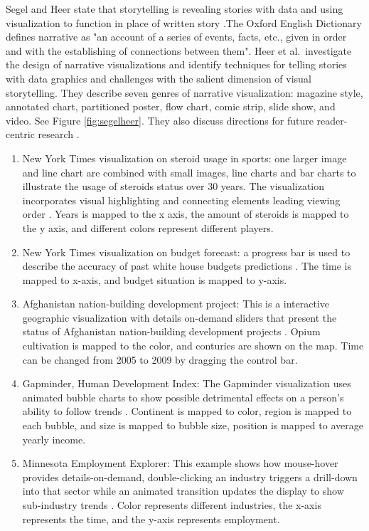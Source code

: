 \documentclass{egpubl}
\begin{document}
 Segel and Heer state that storytelling  is revealing stories with data and using visualization to function in place of written story \cite{segal}.The Oxford English Dictionary defines narrative as "an account of a series of events, facts, etc., given in order and with the establishing of connections between them". 
Heer et al.\ investigate the design of narrative visualizations and identify techniques for telling stories with data graphics and challenges with the salient dimension of visual storytelling. They describe seven genres of narrative visualization: magazine style, annotated chart, partitioned poster, flow chart, comic strip, slide show, and video. See Figure \ref{fig:segelheer}. They also discuss directions for future reader-centric research \cite{Heer1}.
\begin{enumerate}
\item New York Times visualization on steroid usage in sports: one larger image and line chart are combined with small images, line charts and bar charts to illustrate the usage of steroids status over 30 years. The visualization incorporates visual highlighting and connecting elements leading viewing order \cite{steroids}. Years is mapped to the x axis, the amount of steroids is mapped to the y axis, and different colors represent different players.
\item New York Times visualization on budget forecast: a progress bar is used to describe the accuracy of past white house budgets predictions \cite{budget}. The time is mapped to x-axis, and budget situation is mapped to y-axis.
\item Afghanistan nation-building development project: This is a interactive geographic visualization with details on-demand sliders that present the status of Afghanistan nation-building development projects \cite{afghanistan}. Opium cultivation is mapped to the color, and conturies are shown on the map. Time can be changed from 2005 to 2009 by dragging the control bar.
\item Gapminder, Human Development Index: The Gapminder visualization uses animated bubble charts to show possible detrimental effects on a person's ability to follow trends \cite{gapminder2}. Continent is mapped to color, region is mapped to each bubble, and size is mapped to bubble size, position is mapped to average yearly income.
\item Minnesota Employment Explorer: This example shows how mouse-hover provides details-on-demand, double-clicking an industry triggers a drill-down into that sector while an animated transition updates the display to show sub-industry trends \cite{heer2}. Color represents different industries, the x-axis represents the time, and the y-axis represents employment.
\end{enumerate}
\end{document}

